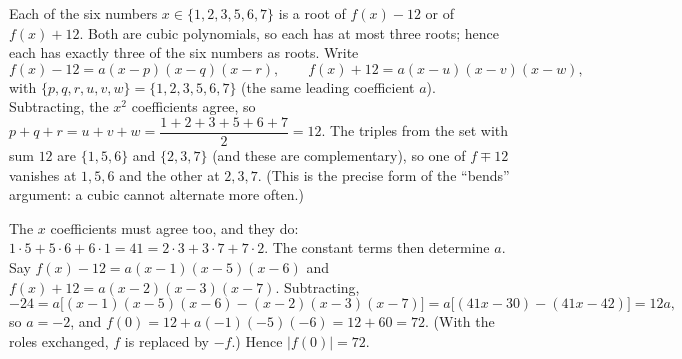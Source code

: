 Each of the six numbers $x\in\{1,2,3,5,6,7\}$ is a root of $f(x)-12$ or of $f(x)+12$. Both are cubic polynomials, so each has at most three roots; hence each has exactly three of the six numbers as roots. Write
\[
f(x)-12=a(x-p)(x-q)(x-r),\qquad f(x)+12=a(x-u)(x-v)(x-w),
\]
with $\{p,q,r,u,v,w\}=\{1,2,3,5,6,7\}$ (the same leading coefficient $a$). Subtracting, the $x^2$ coefficients agree, so $p+q+r=u+v+w=\dfrac{1+2+3+5+6+7}{2}=12$. The triples from the set with sum $12$ are $\{1,5,6\}$ and $\{2,3,7\}$ (and these are complementary), so one of $f\mp12$ vanishes at $1,5,6$ and the other at $2,3,7$. (This is the precise form of the ``bends'' argument: a cubic cannot alternate more often.)

The $x$ coefficients must agree too, and they do: $1\cdot5+5\cdot6+6\cdot1=41=2\cdot3+3\cdot7+7\cdot2$. The constant terms then determine $a$. Say $f(x)-12=a(x-1)(x-5)(x-6)$ and $f(x)+12=a(x-2)(x-3)(x-7)$. Subtracting,
\[
-24=a\bigl[(x-1)(x-5)(x-6)-(x-2)(x-3)(x-7)\bigr]=a\bigl[(41x-30)-(41x-42)\bigr]=12a,
\]
so $a=-2$, and $f(0)=12+a(-1)(-5)(-6)=12+60=72$. (With the roles exchanged, $f$ is replaced by $-f$.) Hence $|f(0)|=\boxed{72}$.

